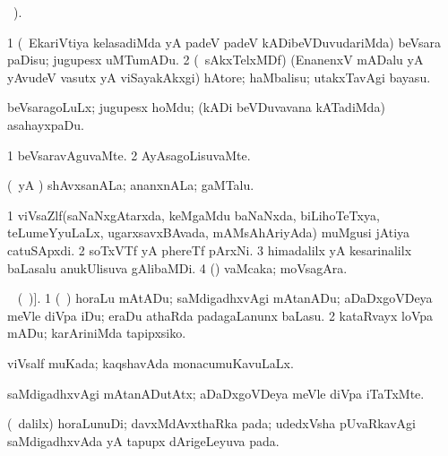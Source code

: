\bentry
{} 
\gl{\kirx}
 \BUkaq\ ).\bmng
\emng

\noindent 
\gl{\sakirx}
\expl{}
\bmng
\bnum
\num{1} (\kanmu\ EkariVtiya kelasadiMda yA padeV padeV kADibeVDuvudariMda) beVsara paDisu; jugupesx uMTumADu. 
\num{2} (\kanmu\ sAkxTelxMDf) (EnanenxV mADalu yA yAvudeV vasutx yA viSayakAkxgi) hAtore; haMbalisu; utakxTavAgi bayasu. 
\enum
\emng

\noindent 
\gl{\akirx}
\expl{}
\bmng
beVsaragoLuLx; jugupesx hoMdu; (kADi beVDuvavana kATadiMda) asahayxpaDu. 
\emng
\eentry

\bentry 
{} 
\gl{\kirxvi}
\expl{}
\bmng
\bnum
\num{1} beVsaravAguvaMte. 
\num{2} AyAsagoLisuvaMte. 
\enum
\emng
\eentry

\bentry
{} 
\gl{\nA}
\expl{}
\bmng
(\pArxparx\ yA \pArxM) shAvxsanALa; ananxnALa; gaMTalu. 
\emng
\eentry

\bentry
{} 
\gl{\nA}
\expl{}
\bmng
\bnum
\num{1} viVsaZlf(saNaNxgAtarxda, keMgaMdu baNaNxda, biLihoTeTxya, teLumeYyuLaLx, ugarxsavxBAvada, mAMsAhAriyAda) muMgusi jAtiya catuSApxdi.  
\num{2} soTxVTf  yA phereTf pArxNi. 
\num{3} himadalilx yA kesarinalilx baLasalu anukUlisuva gAlibaMDi. 
\num{4} (\AmA) vaMcaka; moVsagAra. 
\enum
\emng
\eentry

\bentry
{} 
\gl{\akirx}
\expl{[\BU\ matutx \BUkaq\ \eng{weaselled} (\ame\ \eng{weaseled});}
\vakaq\  (\ame\ )].\bmng
\bnum
\num{1} (\kanmu\ \ame) horaLu mAtADu; saMdigadhxvAgi mAtanADu; aDaDxgoVDeya meVle diVpa iDu; eraDu athaRda padagaLanunx baLasu. 
\num{2} kataRvayx loVpa mADu; karAriniMda tapipxsiko. 
\enum
\emng
\eentry

\bentry
{} 
\gl{\gu}
\expl{}
\bmng
viVsalf muKada; kaqshavAda monacumuKavuLaLx. 
\emng
\eentry

\bentry
{} 
\gl{\kirxvi}
\expl{}
\bmng
saMdigadhxvAgi mAtanADutAtx; aDaDxgoVDeya meVle diVpa iTaTxMte. 
\emng
\eentry

\bentry
{} 
\gl{\nA}
\expl{}
\bmng
(\sA\ \bava dalilx) horaLunuDi; davxMdAvxthaRka pada; udedxVsha pUvaRkavAgi saMdigadhxvAda yA tapupx dArigeLeyuva pada. 
\emng
\eentry


